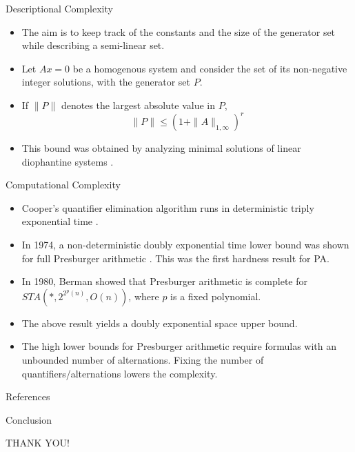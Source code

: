 \documentclass[10pt]{beamer}
\begin{document}
\begin{frame}{Descriptional Complexity}
    \begin{itemize}
        \item The aim is to keep track of the constants and the size of the generator set
        while describing a semi-linear set.
        \item Let $Ax=0$ be a homogenous system and consider the set of its non-negative integer solutions,
        with the generator set $P$. 
        \item  If $\|P\|$ denotes the largest absolute value in $P$, 
        \[\|P\|\leq (1+\|A\|_{1,\infty})^r\]
        \item This bound was obtained by analyzing minimal solutions of linear diophantine systems \cite{pottier1991minimal}.
    \end{itemize}
\end{frame}
\begin{frame}{Computational Complexity}
    \begin{itemize}
        \item Cooper's quantifier elimination algorithm runs in deterministic triply exponential time \cite{oppen1978222pn}.
        \item In 1974, a non-deterministic doubly exponential time lower bound was shown for full
        Presburger arithmetic \cite{fischer1998super}. This was the first hardness result for PA.
        \item In 1980, Berman \cite{berman1980complexity} showed that Presburger arithmetic is complete for $STA(*,2^{2^p(n)},O(n))$, where $p$ 
        is a fixed polynomial.
        \item The above result yields a doubly exponential space upper bound.
        \item The high lower bounds for Presburger arithmetic require formulas
        with an unbounded number of alternations. Fixing the number of quantifiers/alternations 
        lowers the complexity. \nocite{haase2018survival}
    \end{itemize}
\end{frame}
\begin{frame}[allowframebreaks]{References}
{}

\end{frame}
\begin{frame}{Conclusion}
    \begin{center}
        THANK YOU!
    \end{center}
\end{frame}
\end{document}

